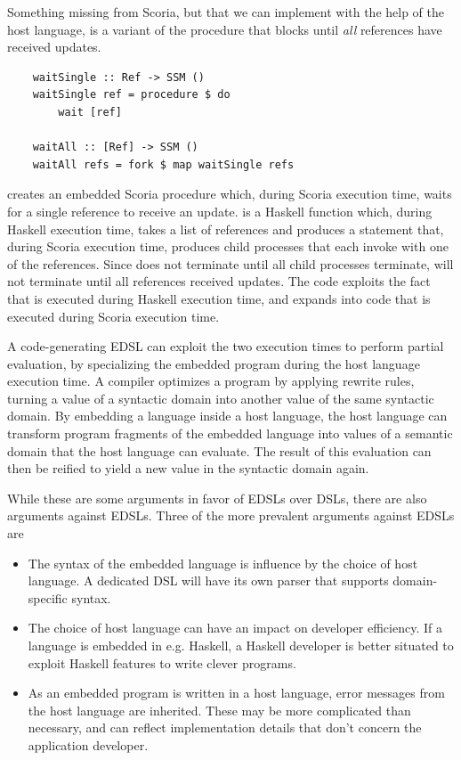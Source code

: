 Something missing from Scoria, but that we can implement with the help of the host language, is a variant of the
 procedure that blocks until \textit{all} references have received updates.

\begin{verbatim}
    waitSingle :: Ref -> SSM ()
    waitSingle ref = procedure $ do
        wait [ref]
    
    waitAll :: [Ref] -> SSM ()
    waitAll refs = fork $ map waitSingle refs
\end{verbatim}

 creates an embedded Scoria procedure which, during Scoria execution time, waits for a
single reference to receive an update.  is a Haskell function which, during Haskell execution time, takes a list of
references and produces a  statement that, during Scoria execution time, produces child processes that each
invoke  with one of the references. Since  does not terminate until all child processes
terminate,  will not terminate until all references received updates. The code exploits the fact that
 is executed during Haskell execution time, and expands into code that is executed during Scoria execution time.

A code-generating EDSL can exploit the two execution times to perform partial evaluation\cite{DBLP:conf/haskell/ValliappanRL21},
by specializing the embedded program during the host language execution time. A compiler optimizes a program by applying
rewrite rules, turning a value of a syntactic domain into another value of the same syntactic domain.
By embedding a language inside a host language, the host language can transform program fragments of the embedded language
into values of a semantic domain that the host language can evaluate. The result of this evaluation can then be reified to
yield a new value in the syntactic domain again.

While these are some arguments in favor of EDSLs over DSLs, there are also arguments against EDSLs. Three of the more prevalent
arguments against EDSLs are

\begin{itemize}
    \item The syntax of the embedded language is influence by the choice of host language. A dedicated DSL will have its own
    parser that supports domain-specific syntax.
    \item The choice of host language can have an impact on developer efficiency. If a language is embedded in e.g. Haskell, a
    Haskell developer is better situated to exploit Haskell features to write clever programs.
    \item As an embedded program is written in a host language, error messages from the host language are inherited. These may
    be more complicated than necessary, and can reflect implementation details that don't concern the application developer.
\end{itemize}

